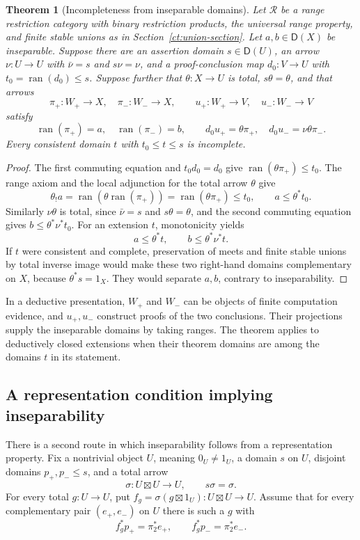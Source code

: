 \documentclass[11pt]{article}
\newtheorem{theorem}{Theorem}[section]
\theoremstyle{definition}
\theoremstyle{remark}
\newcommand{\R}{\mathscr R}
\newcommand{\D}{\mathsf D}
\newcommand{\ran}{\operatorname{ran}}
\begin{document}
\begin{theorem}[Incompleteness from inseparable domains]\label{ct:certificate-transfer}
Let $\R$ be a range restriction category with binary restriction
products, the universal range property, and finite stable unions as in
Section~\ref{ct:union-section}. Let $a,b\in\D(X)$ be inseparable.
Suppose there are an assertion domain $s\in\D(U)$, an arrow
$\nu:U\to U$ with $\bar\nu=s$ and $s\nu=\nu$, and a
proof-conclusion map $d_0:V\to U$ with $t_0=\ran(d_0)\le s$.
Suppose further that $\theta:X\to U$ is total, $s\theta=\theta$,
and that arrows
\[
 \pi_+:W_+\to X,\quad \pi_-:W_-\to X,\qquad
 u_+:W_+\to V,\quad u_-:W_-\to V
\]
satisfy
\begin{equation}\label{ct:certificate-equations}
 \ran(\pi_+)=a,\quad \ran(\pi_-)=b,\qquad
 d_0u_+=\theta\pi_+,\quad d_0u_-=\nu\theta\pi_-.
\end{equation}
Every consistent domain $t$ with $t_0\le t\le s$ is incomplete.
\end{theorem}
\begin{proof}
The first commuting equation and $t_0d_0=d_0$ give
$\ran(\theta\pi_+)\le t_0$. The range axiom and the local adjunction
for the total arrow $\theta$ give
\[
 \theta_!a=\ran(\theta\ran(\pi_+))
 =\ran(\theta\pi_+)\le t_0,
 \qquad a\le\theta^*t_0.
\]
Similarly $\nu\theta$ is total, since $\bar\nu=s$ and
$s\theta=\theta$, and the second commuting equation gives
$b\le\theta^*\nu^*t_0$. For an extension $t$, monotonicity yields
\[
 a\le\theta^*t,\qquad b\le\theta^*\nu^*t.
\]
If $t$ were consistent and complete, preservation of meets and finite
stable unions by total inverse image would make these two right-hand
domains complementary on $X$, because $\theta^*s=1_X$. They would
separate $a,b$, contrary to inseparability.
\end{proof}

In a deductive presentation, $W_+$ and $W_-$ can be objects of finite
computation evidence, and $u_+,u_-$ construct proofs of the two
conclusions. Their projections supply the inseparable domains by taking
ranges. The theorem applies to deductively closed extensions when their
theorem domains are among the domains $t$ in its statement.

\subsection{A representation condition implying inseparability}

There is a second route in which inseparability follows from a
representation property. Fix a nontrivial object $U$, meaning
$0_U\ne1_U$, a domain $s$ on $U$, disjoint domains $p_+,p_-\le s$,
and a total arrow
\[
 \sigma:U\boxtimes U\to U,\qquad s\sigma=\sigma.
\]
For every total $g:U\to U$, put
$f_g=\sigma(g\boxtimes1_U):U\boxtimes U\to U$.
Assume that for every complementary pair $(e_+,e_-)$ on $U$ there is
such a $g$ with
\begin{equation}\label{ct:representation}
 f_g^*p_+=\pi_2^*e_+,\qquad
 f_g^*p_-=\pi_2^*e_-.
\end{equation}
\end{document}

